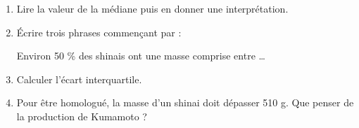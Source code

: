 \begin{exo}
	\begin{enumerate}
		\item Lire la valeur de la médiane puis en donner une interprétation.
		\item Écrire trois phrases commençant par : \begin{center}\og{} Environ 50 \% des shinais ont une masse comprise entre \dots \fg{}\end{center}
		\item Calculer l'écart interquartile.
		\item Pour être homologué, la masse d'un shinai doit dépasser 510 g. Que penser de la production de Kumamoto ?
	\end{enumerate}
\end{exo}
